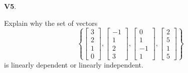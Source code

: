 \documentclass{article}
\newenvironment{problem}[1]
{
  \begin{flushleft}
  \textbf{#1}.
  \ignorespaces
}
{
  \end{flushleft}
}
\begin{document}
\begin{problem}{V5}
Explain why the set of vectors
\[\left\{
 \begin{bmatrix} 3 \\ 2 \\ 1 \\ 0 \end{bmatrix}  ,
 \begin{bmatrix} -1 \\ 1 \\ 2 \\ 3 \end{bmatrix}  ,
 \begin{bmatrix} 0 \\ 1 \\ -1 \\ 1 \end{bmatrix}  , 
 \begin{bmatrix} 2 \\ 5 \\ 1 \\ 5 \end{bmatrix} \right\}\]
is linearly dependent or linearly independent.
\end{problem}
\end{document}
